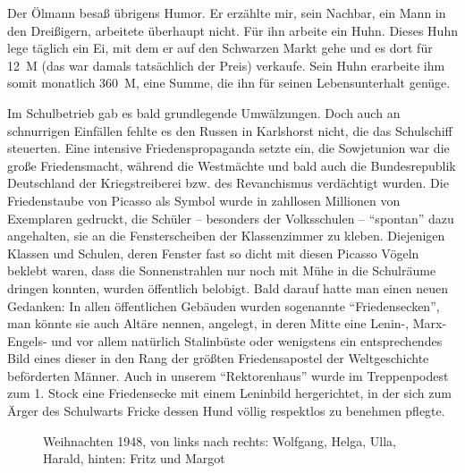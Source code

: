 Der Ölmann besaß übrigens Humor. Er erzählte mir, sein Nachbar, ein Mann in den Dreißigern, arbeitete überhaupt nicht. Für ihn arbeite ein  Huhn. Dieses Huhn lege täglich ein Ei, mit dem er auf den Schwarzen Markt gehe und es dort für 12~M (das war damals tatsächlich der Preis) verkaufe. Sein Huhn erarbeite ihm somit monatlich 360~M, eine Summe, die ihn für seinen Lebensunterhalt genüge.

Im Schulbetrieb gab es bald grundlegende Umwälzungen. Doch auch an schnurrigen Einfällen fehlte es den Russen in Karlshorst nicht, die das Schulschiff steuerten. Eine intensive Friedenspropaganda setzte ein, die Sowjetunion war die große Friedensmacht, während die Westmächte und bald auch die Bundesrepublik Deutschland der Kriegstreiberei bzw. des Revanchismus verdächtigt wurden. Die Friedenstaube von Picasso als Symbol wurde in zahllosen Millionen von Exemplaren gedruckt, die Schüler -- besonders der Volksschulen -- \enquote{spontan} dazu angehalten, sie an die Fensterscheiben der Klassenzimmer zu kleben. Diejenigen Klassen und Schulen, deren Fenster fast so dicht mit diesen Picasso Vögeln beklebt waren, dass die Sonnenstrahlen nur noch mit Mühe in die Schulräume dringen konnten, wurden öffentlich belobigt. Bald darauf hatte man einen neuen Gedanken: In allen öffentlichen Gebäuden wurden sogenannte \enquote{Friedensecken}, man könnte sie auch Altäre nennen, angelegt, in deren  Mitte eine Lenin-, Marx-Engels- und vor allem natürlich Stalinbüste oder wenigstens ein entsprechendes Bild eines dieser in den Rang der größten Friedensapostel der Weltgeschichte beförderten Männer. Auch in unserem \enquote{Rektorenhaus} wurde im Treppenpodest zum 1. Stock eine Friedensecke mit einem Leninbild hergerichtet, in der sich zum Ärger des Schulwarts Fricke dessen Hund völlig respektlos zu benehmen pflegte.

\begin{figure}[t]
	\caption{Weihnachten 1948, von links nach rechts: Wolfgang, Helga, Ulla, Harald, hinten: Fritz und Margot}
	\label{fig:weihnachten_1948}
\end{figure}

